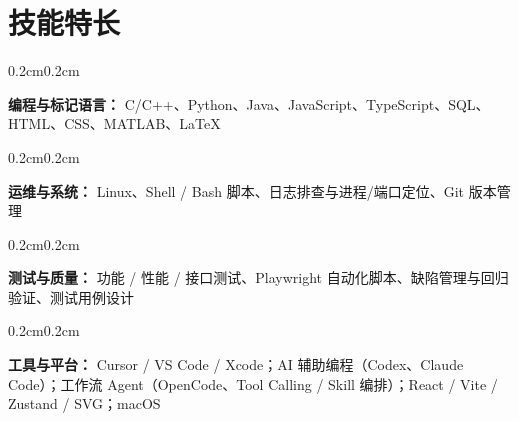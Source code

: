 \documentclass[10pt, a4paper]{article}
\newenvironment{onecolentry}{
    \begin{adjustwidth}{0.2cm}{0.2cm}
}{
    \end{adjustwidth}
}
\begin{document}
\vspace{-0.2cm}

\section{技能特长}

    \begin{onecolentry}
        \textbf{编程与标记语言：} C/C++、Python、Java、JavaScript、TypeScript、SQL、HTML、CSS、MATLAB、LaTeX
    \end{onecolentry}

\vspace{0.06cm}

    \begin{onecolentry}
        \textbf{运维与系统：} Linux、Shell / Bash 脚本、日志排查与进程/端口定位、Git 版本管理
    \end{onecolentry}

\vspace{0.06cm}

    \begin{onecolentry}
        \textbf{测试与质量：} 功能 / 性能 / 接口测试、Playwright 自动化脚本、缺陷管理与回归验证、测试用例设计
    \end{onecolentry}

\vspace{0.06cm}

    \begin{onecolentry}
        \textbf{工具与平台：} Cursor / VS Code / Xcode；AI 辅助编程（Codex、Claude Code）；工作流 Agent（OpenCode、Tool Calling / Skill 编排）；React / Vite / Zustand / SVG；macOS
    \end{onecolentry}

\endgroup
\clearpage
\end{document}
